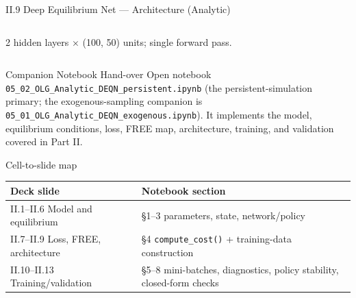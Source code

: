 \documentclass[aspectratio=169,11pt]{beamer}
\newcommand{\emphc}[1]{\textcolor{harvardcrimson}{#1}}
\begin{document}
\begin{frame}{II.9 Deep Equilibrium Net --- Architecture (Analytic)}
\begin{columns}[T,totalwidth=0.96\textwidth]

{\footnotesize 2 hidden layers $\times$ (100, 50) units; single forward pass.}
\end{columns}
\end{frame}


\begin{frame}{Companion Notebook Hand-over}
\scriptsize
\emphc{Open notebook \texttt{05\_02\_OLG\_Analytic\_DEQN\_persistent.ipynb}} (the persistent-simulation primary; the exogenous-sampling companion is \texttt{05\_01\_OLG\_Analytic\_DEQN\_exogenous.ipynb}).  It implements the model, equilibrium conditions, loss, FREE map, architecture, training, and validation covered in Part II.
\vspace{-2pt}
\begin{block}{Cell-to-slide map}
\vspace{-4pt}
\begin{center}\renewcommand{\arraystretch}{0.85}
{\scriptsize
\begin{tabular}{ll}
\toprule
\textbf{Deck slide} & \textbf{Notebook section} \\
\midrule
II.1--II.6 Model and equilibrium        & \S 1--3 \;parameters, state, network/policy \\
II.7--II.9 Loss, FREE, architecture     & \S 4 \;\texttt{compute\_cost()} + training-data construction \\
II.10--II.13 Training/validation        & \S 5--8 \;mini-batches, diagnostics, policy stability, closed-form checks \\
\bottomrule
\end{tabular}}
\end{center}
\vspace{-4pt}
\end{block}
\end{frame}
\end{document}
